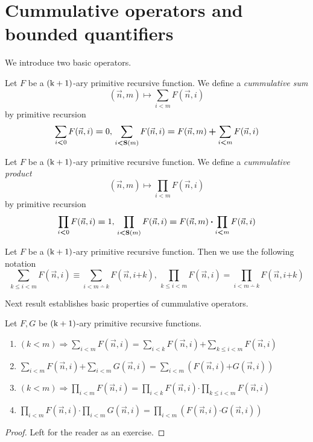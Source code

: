 \documentclass[10pt]{amsart}
\newcommand{\mra}{\boldsymbol{\Rightarrow}}
\newcommand{\mle}{\boldsymbol{<}}
\newcommand{\mleq}{\boldsymbol{\leq}}
\newcommand{\meq}{\boldsymbol{=}}
\newcommand{\mplus}{\boldsymbol{+}}
\newcommand{\mdot}{\boldsymbol{\cdot}}
\begin{document}
\section{Cummulative operators and bounded quantifiers}
\noindent
We introduce two basic operators.

\begin{definition}
	Let $F$ be a $\rm{(k + 1)}$-ary primitive recursive function. We define a \textit{cummulative sum}
	$$(\vec{n},m) \mapsto \sum_{i \mle m}F(\vec{n},i)$$
	by primitive recursion
	$$\sum_{i \mle 0}F(\vec{n},i) \meq 0,\,\sum_{i \mle \bd{S}(m)}F(\vec{n},i) \meq F(\vec{n},m) \mplus \sum_{i \mle m}F(\vec{n},i)$$
\end{definition}

\begin{definition}
	Let $F$ be a $\rm{(k + 1)}$-ary primitive recursive function. We define a \textit{cummulative product}
	$$(\vec{n},m) \mapsto \prod_{i \mle m}F(\vec{n},i)$$
	by primitive recursion
	$$\prod_{i \mle 0}F(\vec{n},i) \meq 1,\,\prod_{i \mle \bd{S}(m)}F(\vec{n},i) \meq F(\vec{n},m)\mdot \prod_{i \mle m}F(\vec{n},i)$$
\end{definition}

\begin{remark}\label{remark:cummulative_operators_with_start_index}
	Let $F$ be a $\rm{(k + 1)}$-ary primitive recursive function. Then we use the following notation
	$$\sum_{k \mleq i \mle m}F(\vec{n},i) \equiv \sum_{i \mle m\dotminus k}F(\vec{n},i \mplus k),\,\prod_{k \mleq i \mle m}F(\vec{n},i) \meq \prod_{i \mle m \dotminus k}F(\vec{n}, i \mplus k)$$
\end{remark}
\noindent
Next result establishes basic properties of cummulative operators.

\begin{fact}\label{fact:basic_properties_of_cummulative_operators}
	Let $F, G$ be $\rm{(k + 1)}$-ary primitive recursive functions.
	\begin{enumerate}[label=\emph{\textbf{(\arabic*)}}, leftmargin=3.0em]
		\item $(k \mle m) \mra \sum_{i \mle m}F(\vec{n},i) \meq \sum_{i \mle k}F(\vec{n},i) \mplus \sum_{k \mleq i \mle m}F(\vec{n},i)$
		\item $\sum_{i \mle m}F(\vec{n},i) \mplus \sum_{i \mle m}G(\vec{n},i) \meq \sum_{i \mle m}\left(F(\vec{n},i) \mplus G(\vec{n},i)\right)$
		\item $(k \mle m) \mra \prod_{i \mle m}F(\vec{n},i) \meq \prod_{i \mle k}F(\vec{n},i) \mdot \prod_{k \mleq i \mle m}F(\vec{n},i)$
		\item $\prod_{i \mle m}F(\vec{n},i) \mdot \prod_{i \mle m}G(\vec{n},i) \meq \prod_{i \mle m}\left(F(\vec{n},i) \mdot G(\vec{n},i)\right)$
	\end{enumerate}
\end{fact}
\begin{proof}
	Left for the reader as an exercise.
\end{proof}
\end{document}
